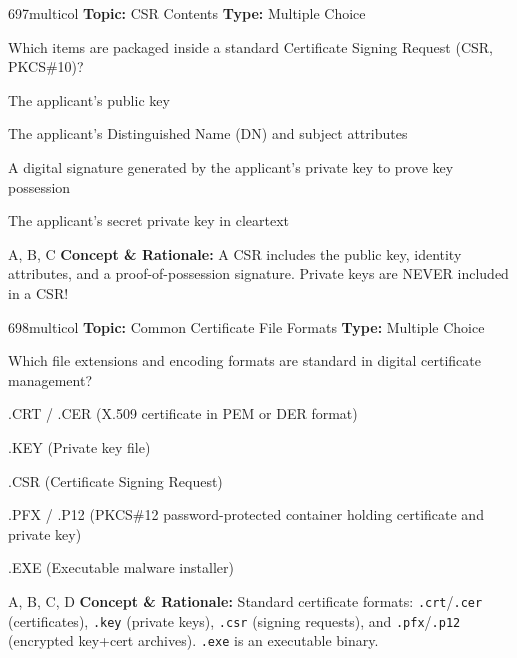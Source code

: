 \begin{qcard}{697}{multicol}
\textcolor{darkslate!75}{\small\textbf{Topic:} CSR Contents \hfill \textbf{Type:} Multiple Choice}\vspace{0.4em}\par
Which items are packaged inside a standard Certificate Signing Request (CSR, PKCS\#10)?
\begin{qoptions}
\item The applicant's public key
\item The applicant's Distinguished Name (DN) and subject attributes
\item A digital signature generated by the applicant's private key to prove key possession
\item The applicant's secret private key in cleartext
\end{qoptions}
\end{qcard}
\nopagebreak
\begin{explainbox}{A, B, C}
\textbf{Concept \& Rationale:} A CSR includes the public key, identity attributes, and a proof-of-possession signature. Private keys are NEVER included in a CSR!
\end{explainbox}

\begin{qcard}{698}{multicol}
\textcolor{darkslate!75}{\small\textbf{Topic:} Common Certificate File Formats \hfill \textbf{Type:} Multiple Choice}\vspace{0.4em}\par
Which file extensions and encoding formats are standard in digital certificate management?
\begin{qoptions}
\item .CRT / .CER (X.509 certificate in PEM or DER format)
\item .KEY (Private key file)
\item .CSR (Certificate Signing Request)
\item .PFX / .P12 (PKCS\#12 password-protected container holding certificate and private key)
\item .EXE (Executable malware installer)
\end{qoptions}
\end{qcard}
\nopagebreak
\begin{explainbox}{A, B, C, D}
\textbf{Concept \& Rationale:} Standard certificate formats: \texttt{.crt}/\texttt{.cer} (certificates), \texttt{.key} (private keys), \texttt{.csr} (signing requests), and \texttt{.pfx}/\texttt{.p12} (encrypted key+cert archives). \texttt{.exe} is an executable binary.
\end{explainbox}

